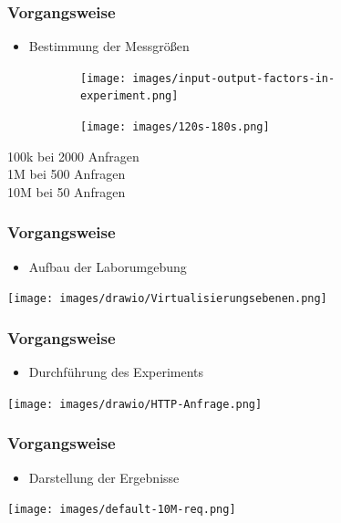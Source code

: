 \documentclass{beamer}
\begin{document}
\begin{frame}
    \frametitle{Vorgangsweise}
    \begin{itemize}
        \item Bestimmung der Messgrößen
    \end{itemize}
    \vspace{0.2cm}

    \begin{figure}[H]
        \centering
        \begin{subfigure}{.5\linewidth}
            \centering
            \texttt{[image: images/input-output-factors-in-experiment.png]}
  \label{fig:sub1}
        \end{subfigure}%
        \begin{subfigure}{.5\linewidth}
            \centering
            \texttt{[image: images/120s-180s.png]}
  \label{fig:sub2}
        \end{subfigure}
\label{fig:byrequestsvs.round-robin100k2000Anfragen}
    \end{figure}

    \vspace{0.2cm}
        100k bei 2000 Anfragen \\
        1M bei 500 Anfragen \\
        10M bei 50 Anfragen
\end{frame}

\begin{frame}
    \frametitle{Vorgangsweise}
    \begin{itemize}
        \item Aufbau der Laborumgebung
    \end{itemize}
    \vspace{1cm}
    \texttt{[image: images/drawio/Virtualisierungsebenen.png]}
\end{frame}

\begin{frame}
    \frametitle{Vorgangsweise}
    \begin{itemize}
        \item Durchführung des Experiments
    \end{itemize}
    \vspace{1cm}
    \texttt{[image: images/drawio/HTTP-Anfrage.png]}
\end{frame}

\begin{frame}
    \frametitle{Vorgangsweise}
    \begin{itemize}
        \item Darstellung der Ergebnisse
    \end{itemize}
    \vspace{0.3cm}
    \texttt{[image: images/default-10M-req.png]}
\end{frame}
\end{document}
